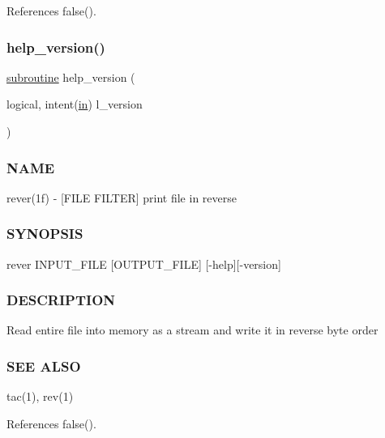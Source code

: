 References false().

\mbox{\label{rever_8f90_a39c21619b08a3c22f19e2306efd7f766}} 
\subsubsection{\texorpdfstring{help\+\_\+version()}{help\_version()}}
{\footnotesize\ttfamily \hyperlink{M__stopwatch_83_8txt_acfbcff50169d691ff02d4a123ed70482}{subroutine} help\+\_\+version (\begin{DoxyParamCaption}\item[{logical, intent(\hyperlink{M__journal_83_8txt_afce72651d1eed785a2132bee863b2f38}{in})}]{l\+\_\+version }\end{DoxyParamCaption})}



\subsubsection*{N\+A\+ME}

rever(1f) -\/ \mbox{[}F\+I\+LE F\+I\+L\+T\+ER\mbox{]} print file in reverse 

\subsubsection*{S\+Y\+N\+O\+P\+S\+IS}

\begin{DoxyVerb}    rever INPUT_FILE [OUTPUT_FILE] [-help][-version]
\end{DoxyVerb}


\subsubsection*{D\+E\+S\+C\+R\+I\+P\+T\+I\+ON}

Read entire file into memory as a stream and write it in reverse byte order \subsubsection*{S\+EE A\+L\+SO}

tac(1), rev(1) 

References false().

\mbox{\label{rever_8f90_aa04a8c02de71e8109e9239487c94ea6c}} 
